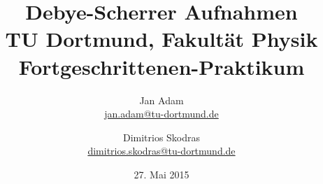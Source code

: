 



\title{Debye-Scherrer Aufnahmen\\				%
\large TU Dortmund, Fakultät Physik\\ 
\normalsize Fortgeschrittenen-Praktikum}

\author{Jan Adam\\			%
{\small \href{jan.adam@tu-dortmund.de}{jan.adam@tu-dortmund.de}}	%
\and						%
Dimitrios Skodras\\					%
{\small \href{dimitrios.skodras@tu-dortmund.de}{dimitrios.skodras@tu-dortmund.de}}		%
}
\date{27. Mai 2015}				%





\maketitle					%
\thispagestyle{empty} 				%



\tableofcontents


\newpage					%


